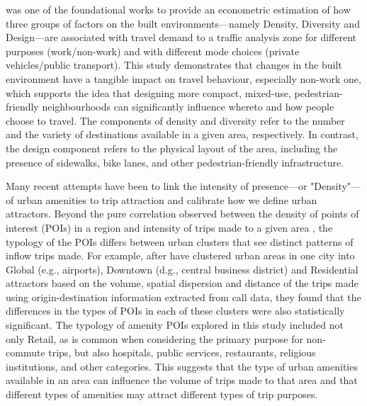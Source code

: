 \citet{cerveroTravelDemand3Ds1997} was one of the foundational works to provide an econometric estimation of how three groups of factors on the built environments---namely Density, Diversity and Design---are associated with travel demand to a traffic analysis zone for different purposes (work/non-work) and with different mode choices (private vehicles/public transport). This study demonstrates that changes in the built environment have a tangible impact on travel behaviour, especially non-work one, which supports the idea that designing more compact, mixed-use, pedestrian-friendly neighbourhoods can significantly influence whereto and how people choose to travel. The components of density and diversity refer to the number and the variety of destinations available in a given area, respectively. In contrast, the design component refers to the physical layout of the area, including the presence of sidewalks, bike lanes, and other pedestrian-friendly infrastructure.

Many recent attempts have been to link the intensity of presence---or "Density"---of urban amenities to trip attraction and calibrate how we define urban attractors. Beyond the pure correlation observed between the density of points of interest (POIs) in a region and intensity of trips made to a given area \citep{melikovCharacterizingUrbanMobility2021}, the typology of the POIs differs between urban clusters that see distinct patterns of inflow trips made. For example, after \citet{aaqibjavedEstimationTripAttraction2020} have clustered urban areas in one city into Global (e.g., airports), Downtown (d.g., central business district) and Residential attractors based on the volume, spatial dispersion and distance of the trips made using origin-destination information extracted from call data, they found that the differences in the types of POIs in each of these clusters were also statistically significant. The typology of amenity POIs explored in this study included not only Retail, as is common when considering the primary purpose for non-commute trips, but also hospitals, public services, restaurants, religious institutions, and other categories. This suggests that the type of urban amenities available in an area can influence the volume of trips made to that area and that different types of amenities may attract different types of trip purposes.

